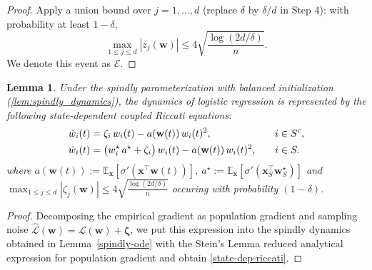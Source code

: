 \documentclass{article}
\theoremstyle{plain}
\newtheorem{lemma}[theorem]{Lemma}
\theoremstyle{definition}
\theoremstyle{remark}
\begin{document}
{\begin{proof}
Apply a union bound over $j=1,\dots,d$ (replace $\delta$ by $\delta/d$ in Step 4):
with probability at least $1-\delta$,
\[
\max_{1\le j\le d}|z_j(\boldsymbol w)|
\le
4\sqrt{\frac{\log(2d/\delta)}{n}}.
\]
We denote this event as $\mathcal{E}$. 
\end{proof}


\begin{lemma}

 Under the spindly parameterization with balanced initialization (\ref{lem:spindly_dynamics}), the dynamics of logistic regression is represented by the following state-dependent coupled Riccati equations:
\begin{align}
\label{state-dep-riccati-restate}
\dot w_i(t)
&=
\zeta_i\, w_i(t) - a(\mathbf w(t))\, w_i(t)^2,
\quad && i \in S^c,
\notag\\
\dot w_i(t)
&=
\bigl(w_i^\star\, a^\star + \zeta_i\bigr)\, w_i(t)
- a(\mathbf w(t))\, w_i(t)^2,
\quad && i \in S.
\end{align}
where $a(\mathbf w(t)) :=\mathbb E_{\boldsymbol x}\!\left[\sigma'(\boldsymbol x^\top \boldsymbol w(t))\right] $, $a^\star:=\mathbb E_{\boldsymbol x}\!\left[\sigma'(\mathbf x_S^\top \mathbf w_S^\star)\right]$ and $\max_{1\le j\le d}|\zeta_j(\boldsymbol w)|
\le
4\sqrt{\frac{\log(2d/\delta)}{n}}$ occuring with probability $(1-\delta)$. 
\end{lemma}

\begin{proof}
Decomposing the empirical gradient as population gradient and sampling noise $\hat{\mathcal{L}}(\mathbf{w}) = {\mathcal{L}}(\mathbf{w}) + \mathbf{\zeta}$, we put this expression into the spindly dynamics obtained in Lemma~\ref{spindly-ode} with the Stein's Lemma reduced analytical expression for population gradient and obtain \eqref{state-dep-riccati}.
\end{proof}

}
\end{document}
